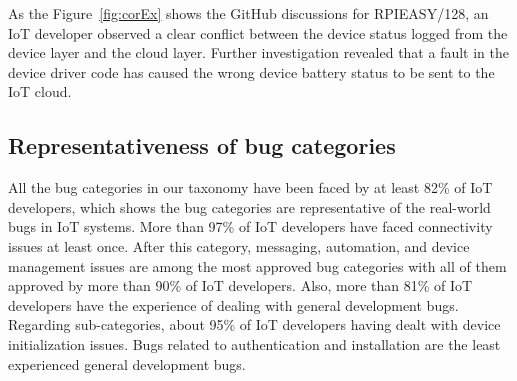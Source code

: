 As the Figure~\autoref{fig:corEx} shows the GitHub discussions for RPIEASY/128, an IoT developer observed a clear conflict between the device status logged from the device layer and the cloud layer. Further investigation revealed that a fault in the device driver code has caused the wrong device battery status to be sent to the IoT cloud.

 \begin{table}[htbp]
\caption{Bug Categories with Positive Correlation}
\begin{center}
\label{tab:correlations}
\end{center}
\end{table}

\subsection{Representativeness of bug categories}
All the bug categories in our taxonomy have been faced by at least 82\% of IoT developers, which shows the bug categories are representative of the real-world bugs in IoT systems. More than 97\% of IoT developers have faced connectivity issues at least once.  After this category, messaging, automation, and device management issues are among the most approved bug categories with all of them approved by more than 90\% of IoT developers. Also, more than 81\% of IoT developers have the experience of dealing with general development bugs. Regarding sub-categories, about 95\% of IoT developers having dealt with device initialization issues. Bugs related to authentication and installation are the least experienced general development bugs. 

